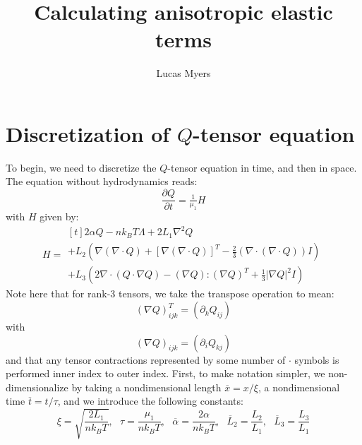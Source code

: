 \documentclass[reqno]{article}
\begin{document}
\title{Calculating anisotropic elastic terms}
\author{Lucas Myers}
\maketitle

\section{Discretization of $Q$-tensor equation}

To begin, we need to discretize the $Q$-tensor equation in time, and then in space.
The equation without hydrodynamics reads:
\begin{equation} \label{eq:Q-tensor-equation}
    \frac{\partial Q}{\partial t}
    =
    \tfrac{1}{\mu_1} H
\end{equation}
with $H$ given by:
\begin{equation}
    H
    =
    \begin{multlined}[t]
      2 \alpha Q - n k_B T \Lambda + 2 L_1 \nabla^2 Q \\
      + L_2 \left(
        \nabla \left( \nabla \cdot Q \right)
        + \left[ \nabla \left( \nabla \cdot Q \right) \right]^T
        - \tfrac23 \left( \nabla \cdot \left( \nabla \cdot Q \right) \right) I
      \right) \\
      + L_3 \left(
        2 \nabla \cdot \left( Q \cdot \nabla Q \right)
        - \left( \nabla Q \right) : \left( \nabla Q \right)^T
        + \tfrac13 \left| \nabla Q \right|^2 I
      \right)
    \end{multlined}
\end{equation}
Note here that for rank-3 tensors, we take the transpose operation to mean:
\begin{equation}
    \left( \nabla Q \right)^T_{ijk}
    =
    \left( \partial_k Q_{ij} \right)
\end{equation}
with
\begin{equation}
    \left( \nabla Q \right)_{ijk}
    =
    \left( \partial_i Q_{kj} \right)
\end{equation}
and that any tensor contractions represented by some number of $\cdot$ symbols is performed inner index to outer index.
First, to make notation simpler, we non-dimensionalize by taking a nondimensional length $\overline{x} = x / \xi$, a nondimensional time $\overline{t} = t / \tau$, and we introduce the following constants:
\begin{equation} \label{eq:nondimensional-quantities}
    \xi = \sqrt{\frac{2L_1}{n k_B T}}, \:\:\:
    \tau = \frac{\mu_1}{n k_B T}, \:\:\:
    \overline{\alpha} = \frac{2 \alpha}{n k_B T}, \:\:\:
    \overline{L}_2 = \frac{L_2}{L_1}, \:\:\:
    \overline{L}_3 = \frac{L_3}{L_1}
\end{equation}
\end{document}
